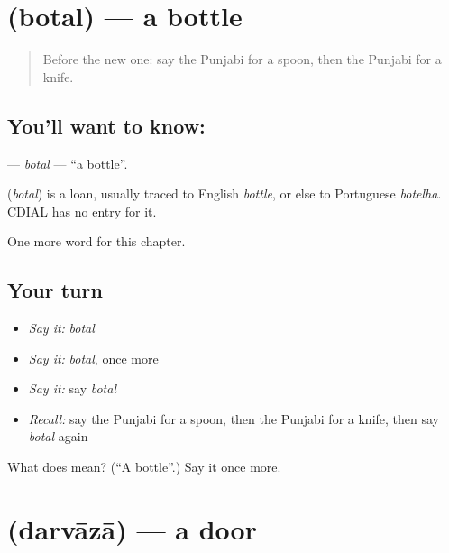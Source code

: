 \section[\texorpdfstring{\pa{ਬੋਤਲ} (botal)}{ਬੋਤਲ (botal)}]{ (botal) — a bottle}

\label{lesson:PA-C70-botal}



\begin{quote}
Before the new one: say the Punjabi for a spoon, then the Punjabi for a knife.
\end{quote}

\subsection*{You'll want to know: }
\textbf{} — \emph{botal} — \textquotedblleft{}a bottle\textquotedblright{}.

\begin{cousinweb}
\textbf{} (\emph{botal}) is a loan, usually traced to English \emph{bottle}, or else to Portuguese \emph{botelha}. CDIAL has no entry for it.
\end{cousinweb}

\begin{grammarlens}[title={What you've built}]
One more word for this chapter.
\end{grammarlens}

\subsection*{Your turn}
\begin{itemize}
\raggedright
  \item \emph{Say it:} \emph{botal}
  \item \emph{Say it:} \emph{botal}, once more
  \item \emph{Say it:} say \emph{botal}
  \item \emph{Recall:} say the Punjabi for a spoon, then the Punjabi for a knife, then say \emph{botal} again
\end{itemize}

\begin{tcolorbox}[breakable,colback=teal!4,colframe=teal!35!black,title={Before you move on}]
What does  mean? (\textquotedblleft{}A bottle\textquotedblright{}.) Say it once more.
\end{tcolorbox}
\section[\texorpdfstring{\pa{ਦਰਵਾਜ਼ਾ} (darvāzā)}{ਦਰਵਾਜ਼ਾ (darvāzā)}]{ (darvāzā) — a door}

